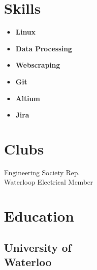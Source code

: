 \documentclass[]{chandan-cv}
\begin{document}
\begin{minipage}[t]{0.27\textwidth}

\section{Skills}
	\begin{itemize}
		\setlength\itemsep{-0.15em}
		\item \textbf{Linux}
		\item \textbf{Data Processing}
		\item \textbf{Webscraping}
		\item \textbf{Git}
		\item \textbf{Altium}
		\item \textbf{Jira}
	\end{itemize}
\sectionsep


\section{Clubs}
Engineering Society Rep.\\
Waterloop Electrical Member
\sectionsep



\section{Education}

\subsection{University of \\
Waterloo}
\sectionsep


%
%

\end{minipage}
\hfill
\end{document}
